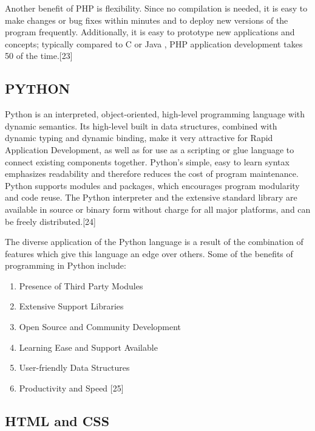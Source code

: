 \documentclass[a4paper,12pt]{report}
\begin{document}
Another benefit of PHP is flexibility. Since no compilation is
needed, it is easy to make changes or bug fixes within minutes
and to deploy new versions of the program frequently. Additionally,
it is easy to prototype new applications and concepts; typically
compared to C or Java , PHP application development takes 50%
of the time.[23]\\


\subsection{PYTHON}

\par Python is an interpreted, object-oriented, high-level programming language with dynamic semantics. Its high-level built in data structures, combined with dynamic typing and dynamic binding, make it very attractive for Rapid Application Development, as well as for use as a scripting or glue language to connect existing components together. Python's simple, easy to learn syntax emphasizes readability and therefore reduces the cost of program maintenance. Python supports modules and packages, which encourages program modularity and code reuse. The Python interpreter and the extensive standard library are available in source or binary form without charge for all major platforms, and can be freely distributed.[24]\\

\par The diverse application of the Python language is a result of the combination of features which give this language an edge over others. Some of the benefits of programming in Python include:\\
    \begin{enumerate}
        \item  Presence of Third Party Modules
        \item  Extensive Support Libraries
        \item  Open Source and Community Development
        \item  Learning Ease and Support Available
        \item  User-friendly Data Structures
        \item  Productivity and Speed [25]
    \end{enumerate}


\subsection{HTML and CSS}
\end{document}
